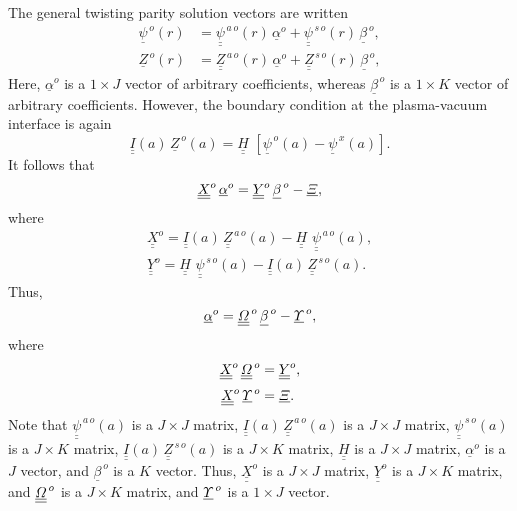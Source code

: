 \documentclass[12pt,prb,aps,notitlepage]{revtex4-1}
\begin{document}
The general twisting parity solution vectors are written
\begin{align}
\underline{\psi}^{\,o}(r) &= \underline{\underline{\psi}}^{\,a\,o}(r)\,\underline{\alpha}^o+  \underline{\underline{\psi}}^{\,s\,o}(r)\,\underline{\beta}^{\,o},\\[0.5ex]
\underline{Z}^{\,o}(r) &= \underline{\underline{Z}}^{\,a\,o}(r)\,\underline{\alpha}^o+  \underline{\underline{Z}}^{\,s\,o}(r)\,\underline{\beta}^{\,o},
\end{align}
Here, $\underline{\alpha}^o$ is a $1\times J$ vector of arbitrary coefficients, whereas $\underline{\beta}^{\,o}$ is a $1\times K$ vector of arbitrary coefficients. 
However, the boundary condition at the plasma-vacuum interface is again 
\begin{equation}
\underline{\underline{I}}(a)\,\underline{Z}^{\,o}(a) = \underline{\underline{H}}\,\,[\underline{\psi}^{\,o}(a)-\underline{\psi}^{\,x}(a)].
\end{equation}
It follows that
\begin{equation}
\underline{\underline{X}}^o\,\underline{\alpha}^o = \underline{\underline{Y}}^o\,\underline{\beta}^{\,o}- \underline{\mit\Xi},
\end{equation}
where
\begin{align}
\underline{\underline{X}}^o = \underline{\underline{I}}(a)\,\underline{\underline{Z}}^{\,a\,o}(a)- \underline{\underline{H}}\,\,\underline{\underline{\psi}}^{\,a\,o}(a),\\[0.5ex]
\underline{\underline{Y}}^o = \underline{\underline{H}}\,\,\underline{\underline{\psi}}^{\,s\,o}(a)- \underline{\underline{I}}(a)\,\underline{\underline{Z}}^{\,s\,o}(a).
\end{align}
Thus,
\begin{equation}
\underline{\alpha}^o = \underline{\underline{\mit\Omega}}^{\,o}\,\underline{\beta}^{\,o} - \underline{\mit\Upsilon}^{\,o},
\end{equation}
where
\begin{align}
\underline{\underline{X}}^o\,\underline{\underline{\mit\Omega}}^{\,o}&= \underline{\underline{Y}}^o,\\[0.5ex]
\underline{\underline{X}}^o\,\underline{\mit\Upsilon}^{\,o}&= \underline{\mit\Xi}.
\end{align}
Note that $\underline{\underline{\psi}}^{\,a\,o}(a)$ is a $J\times J$ matrix, $\underline{\underline{I}}(a)\,\underline{\underline{Z}}^{\,a\,o}(a)$  is a $J\times J$ matrix, 
$\underline{\underline{\psi}}^{\,s\,o}(a)$ is a $J\times K$ matrix, $\underline{\underline{I}}(a)\,\underline{\underline{Z}}^{\,s\,o}(a)$  is a $J\times K$ matrix, 
$\underline{\underline{H}}$ is a $J\times J$ matrix, $\underline{\alpha}^o$ is
a $J$ vector, and $\underline{\beta}^{\,o}$ is a $K$ vector. Thus, $\underline{\underline{X}}^o$ is a $J\times J$ matrix, $\underline{\underline{Y}}^o$
is a $J\times K$ matrix, and $\underline{\underline{\mit\Omega}}^{\,o}$ is a $J\times K$ matrix, and $\underline{\mit\Upsilon}^{\,o}$ is a $1\times J$ vector. 
\end{document}
